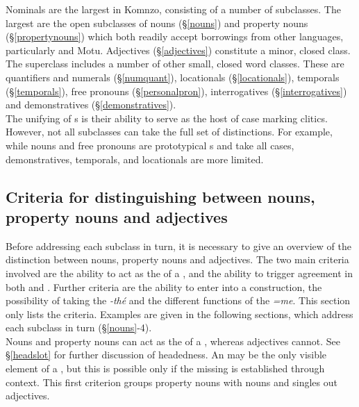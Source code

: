 Nominals are the largest  in Komnzo, consisting of a number of subclasses. The largest are the open subclasses of nouns (\S{}\ref{nouns}) and property nouns (\S{}\ref{propertynouns}) which both readily accept borrowings from other languages, particularly  and Motu. Adjectives (\S{}\ref{adjectives}) constitute a minor, closed class. The  superclass includes a number of other small, closed word classes. These are quantifiers and numerals (\S{}\ref{numquant}), locationals (\S{}\ref{locationals}), temporals (\S{}\ref{temporals}), free pronouns (\S{}\ref{personalpron}), interrogatives (\S{}\ref{interrogatives}) and demonstratives (\S{}\ref{demonstratives}).\\

The unifying of s is their ability to serve as the host of case marking clitics. However, not all  subclasses can take the full set of  distinctions. For example, while nouns and free pronouns are prototypical s and take all cases, demonstratives, temporals, and locationals are more limited.

\subsection[Overview of criteria]{Criteria for distinguishing between nouns, property nouns and adjectives} \label{criteria-for-distinguishing-between-n-pn-adj}

Before addressing each subclass in turn, it is necessary to give an overview of the distinction between nouns, property nouns and adjectives. The two main criteria involved are the ability to act as the  of a , and the ability to trigger agreement in both  and . Further criteria are the ability to enter into a  construction, the possibility of taking the  \emph{-thé} and the different functions of the   \emph{=me}. This section only lists the criteria. Examples are given in the following sections, which address each subclass in turn (\S{}\ref{nouns}-4).\\

Nouns and property nouns can act as the  of a , whereas adjectives cannot. See \S{}\ref{headslot} for further discussion of headedness. An  may be the only visible element of a , but this is possible only if the missing  is established through context. This first criterion groups property nouns with nouns and singles out adjectives.\\

